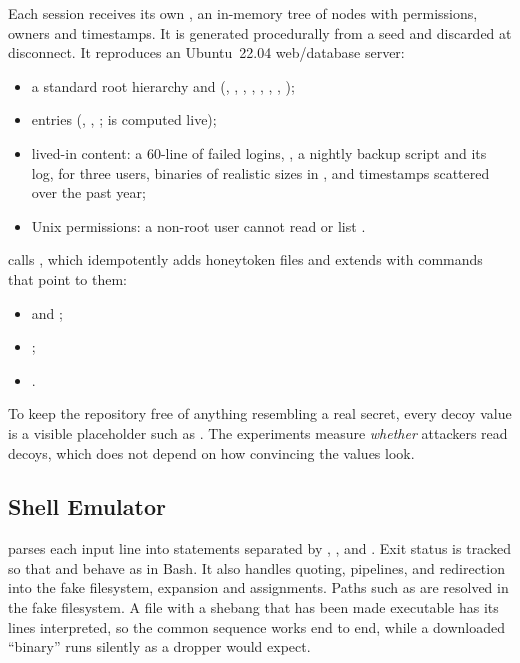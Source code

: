 Each session receives its own , an in-memory tree of nodes with
permissions, owners and timestamps. It is generated procedurally from a seed and discarded at
disconnect. It reproduces an Ubuntu~22.04 web/database server:
\begin{itemize}
  \item a standard root hierarchy and  (, , ,
    , , , , );
  \item {} entries (, , ;  is computed live);
  \item lived-in content: a 60-line  of failed logins, , a nightly
    backup script and its log,  for three users, binaries of realistic
    sizes in , and timestamps scattered over the past year;
  \item Unix permissions: a non-root user cannot read  or list .
\end{itemize}

 calls , which idempotently adds honeytoken files and extends
 with commands that point to them:
\begin{itemize}
  \item {} and ;
  \item {};
  \item {}.
\end{itemize}
To keep the repository free of anything resembling a real secret, every decoy value is a
visible placeholder such as . The experiments measure \emph{whether}
attackers read decoys, which does not depend on how convincing the values look.

\subsection{Shell Emulator}

 parses each input line into statements separated by \code{;}, \code{\&\&},
\code{||} and \code{\&}. Exit status is tracked so that  and
 behave as in Bash. It also handles quoting, pipelines, \code{>} and \code{>>}
redirection into the fake filesystem,  expansion and  assignments.
Paths such as  are resolved in the fake filesystem. A file with a shebang that
has been made executable has its lines interpreted, so the common
 sequence works end to end, while a downloaded
``binary'' runs silently as a dropper would expect.


